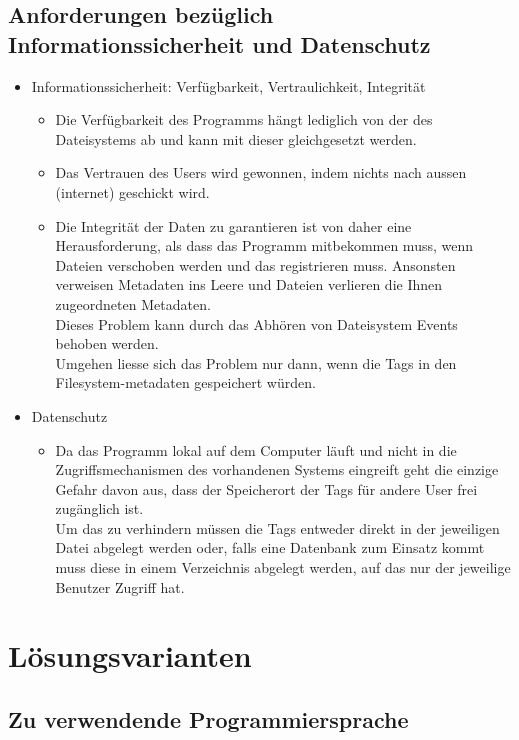 \documentclass[10pt,paper=a4,final]{scrartcl}
\begin{document}
\subsection{Anforderungen bez\"uglich Informationssicherheit und Datenschutz}
\begin{itemize}
  \item Informationssicherheit:  Verfügbarkeit, Vertraulichkeit, Integrität
    \begin{itemize}
      \item Die Verfügbarkeit des Programms hängt lediglich von der des Dateisystems ab und kann mit dieser gleichgesetzt werden.
      \item Das Vertrauen des Users wird gewonnen, indem nichts nach aussen (internet) geschickt wird.
      \item Die Integrität der Daten zu garantieren ist von daher eine Herausforderung, als dass das Programm mitbekommen muss, wenn Dateien verschoben werden und das registrieren muss. Ansonsten verweisen Metadaten ins Leere und Dateien verlieren die Ihnen zugeordneten 	Metadaten.\\
	Dieses Problem kann durch das Abhören von Dateisystem Events behoben werden.\\
	Umgehen liesse sich das Problem nur dann, wenn die Tags in den Filesystem-metadaten gespeichert würden.\\
    \end{itemize}
  \item Datenschutz
    \begin{itemize}
      \item Da das Programm lokal auf dem Computer läuft und nicht in die Zugriffsmechanismen des vorhandenen Systems eingreift geht die einzige Gefahr davon aus, dass der Speicherort der Tags für andere User frei zugänglich ist.\\
	Um das zu verhindern müssen die Tags entweder direkt in der jeweiligen Datei abgelegt werden oder, falls eine Datenbank zum Einsatz kommt muss diese in einem Verzeichnis abgelegt werden, auf das nur der jeweilige Benutzer Zugriff hat.
    \end{itemize}
\end{itemize}
\newpage
\section{L\"osungsvarianten}
\subsection{Zu verwendende Programmiersprache}
\end{document}
